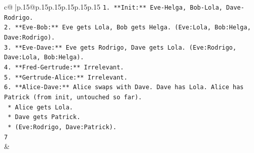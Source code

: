 \documentclass{article}
\begin{document}
{\begin{supertabular}{c@{$\;$}|p{.15\linewidth}@{}p{.15\linewidth}p{.15\linewidth}p{.15\linewidth}p{.15\linewidth}p{.15\linewidth}}
{{{\texttt{1.  **Init:** Eve{-}Helga, Bob{-}Lola, Dave{-}Rodrigo.} \\
\texttt{2.  **Eve{-}Bob:** Eve gets Lola, Bob gets Helga. (Eve:Lola, Bob:Helga, Dave:Rodrigo).} \\
\texttt{3.  **Eve{-}Dave:** Eve gets Rodrigo, Dave gets Lola. (Eve:Rodrigo, Dave:Lola, Bob:Helga).} \\
\texttt{4.  **Fred{-}Gertrude:** Irrelevant.} \\
\texttt{5.  **Gertrude{-}Alice:** Irrelevant.} \\
\texttt{6.  **Alice{-}Dave:** Alice swaps with Dave. Dave has Lola. Alice has Patrick (from init, untouched so far).} \\
\texttt{    *   Alice gets Lola.} \\
\texttt{    *   Dave gets Patrick.} \\
\texttt{    *   (Eve:Rodrigo, Dave:Patrick).} \\
\texttt{7} \\
            }
        }
    }
    & \\ \\

\end{supertabular}
}
\end{document}
